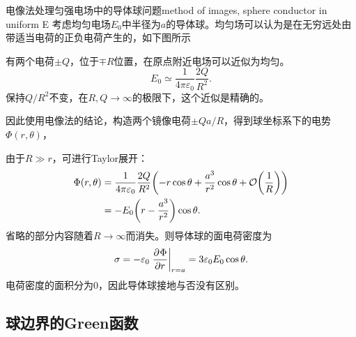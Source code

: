 \begin{example}{电像法处理匀强电场中的导体球问题}{method of images, sphere conductor in uniform E}
    考虑均匀电场$E_0$中半径为$a$的导体球。均匀场可以认为是在无穷远处由带适当电荷的正负电荷产生的，如下图所示
    \begin{center}
        \label{fig:uniform E approx +-q}
    \end{center}
    有两个电荷$\pm Q$，位于$\mp R$位置，在原点附近电场可以近似为均匀。
    \[
        E_0\simeq\frac1{4\pi\varepsilon_0}\frac{2Q}{R^2}.
    \]
    保持$Q/R^2$不变，在$R,Q\to\infty$的极限下，这个近似是精确的。

    因此使用电像法的结论，构造两个镜像电荷$\pm Qa/R$，得到球坐标系下的电势$\Phi(r,\theta)$，

    由于$R\gg r$，可进行Taylor展开：
    \begin{align}
        \notag
        \Phi(r,\theta)&=\frac1{4\pi\varepsilon_0}\frac{2Q}{R^2}\biggl(-r\cos\theta+\frac{a^3}{r^2}\cos\theta+\mathcal O\biggl(\frac1R\biggr)\biggr)\\
        &=-E_0\biggl(r-\frac{a^3}{r^2}\biggr)\cos\theta.
    \end{align}
    省略的部分内容随着$R\to\infty$而消失。则导体球的面电荷密度为
    \begin{equation}
        \sigma=-\varepsilon_0\left.\frac{\partial^{{}}\Phi}{\partial{r}^{{}}}\right\rvert_{r=a}=3\varepsilon_0E_0\cos\theta.
    \end{equation}
    电荷密度的面积分为0，因此导体球接地与否没有区别。
\end{example}

\subsection{球边界的Green函数}
\label{ssec:Green function, sphere}

